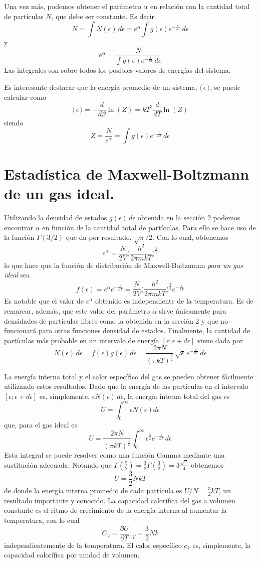 \documentclass[12pt,a4paper]{article}
\def\e{{\epsilon}} %
\begin{document}
Una vez más, podemos obtener el parámetro $\alpha$ en relación con la cantidad total de partículas $N$, que debe ser constante. Es decir
\[ N=\int N(\e) \, d\e=e^{\alpha} \int g(\e) e^{-\frac{\e}{kT}} \, d\e \]
y
\[ e^{\alpha}=\dfrac{N}{\int g(\e) e^{-\frac{\e}{kT}} \, d\e} \]
Las integrales son sobre todos los posibles valores de energías del sistema.

Es interesante destacar que la energía promedio de un sistema, $\langle \, \e \, \rangle$, se puede calcular como
\[ \langle \, \e \, \rangle = -\frac{d}{d\beta} \ln (Z) = kT^{2} \frac{d}{dT} \ln (Z) \]
siendo
\[ Z=\dfrac{N}{e^{\alpha}}=\int g(\e)e^{-\frac{\e}{kT}} \, d\e \]

\section{Estadística de Maxwell-Boltzmann de un gas ideal.}

Utilizando la densidad de estados $g(\e) \, d\e$ obtenida en la sección 2 podemos encontrar $\alpha$ en función de la cantidad total de partículas. Para ello se hace uso de la función $\Gamma (3/2)$ que da por resultado, $\sqrt{\pi}/2$. Con lo cual, obtenemos
\[ e^{\alpha}=\frac{N}{2V} \bigg( \frac{h^{2}}{2 \pi m k T} \bigg)^{\frac{3}{2}}\]
lo que hace que la función de distribución de Maxwell-Boltzmann \emph{para un gas ideal} sea
\[ f(\e)=e^{\alpha}e^{-\frac{\e}{kT}}=\frac{N}{2V} \bigg( \frac{h^{2}}{2 \pi m k T} \bigg)^{\frac{3}{2}} e^{-\frac{\e}{kT}} \]
Es notable que el valor de $e^{\alpha}$ obtenido es independiente de la temperatura. Es de remarcar, además, que este valor del parámetro $\alpha$ sirve únicamente para densidades de partículas libres como la obtenida en la sección 2 y que no funcionará para otras funciones densidad de estados. Finalmente, la cantidad de partículas más probable en un intervalo de energía $[\e;\e+d\e]$ viene dada por
\[ N(\e) \, d\e=f(\e)g(\e) \, d\e=\frac{2 \pi N}{(\pi k T)^{\frac{3}{2}}} \, \sqrt{\e} \, e^{-\frac{\e}{kT}} \, d\e \]

La energía interna total y el calor específico del gas se pueden obtener fácilmente utilizando estos resultados. Dado que la energía de las partículas en el intervalo $[\e;\e+d\e]$ es, simplemente, $\e N(\e) \, d\e$, la energía interna total del gas es
\[ U=\int _{0}^{\infty} \e N(\e) d\e \]
que, para el gas ideal es
\[ U=\frac{2 \pi N}{(\pi k T)^{\frac{3}{2}}} \int _{0}^{\infty} \e^{\frac{3}{2}} e^{-\frac{\e}{kT}} \, d\e \]
Esta integral se puede resolver como una función Gamma mediante una sustitución adecuada. Notando que $\Gamma (\frac{5}{2})=\frac{3}{2} \Gamma (\frac{3}{2})=3\frac{\sqrt{\pi}}{4}$ obtenemos
\[ U=\frac{3}{2}NkT \]
de donde la energía interna promedio de cada partícula es $U/N=\frac{3}{2}kT$, un resultado importante y conocido. La capacidad calorífica del gas a volumen constante es el ritmo de crecimiento de la energía interna al aumentar la temperatura, con lo cual
\[ C_{V}= \frac{\partial U}{\partial T} \rfloor_{V} =  \frac{3}{2}Nk \]
independientemente de la temperatura. El calor específico $c_{V}$ es, simplemente, la capacidad calorífica por unidad de volumen.
\end{document}
